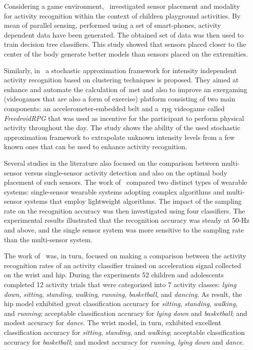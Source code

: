 Considering a game environment,~\cite{jablonsky_evaluating_2017} investigated sensor placement and modality for activity recognition within the context of children playground  activities. By mean of parallel sensing, performed using a set of smart-phones, activity dependent data have been generated. The obtained set of data was then used to train decision tree classifiers. This study showed that sensors placed closer to the center of the body generate better models than sensors placed on the extremities. 

Similarly, in~\cite{alshurafa_designing_2014} a stochastic approximation framework for intensity independent activity recognition based on clustering techniques is proposed. They aimed at enhance and automate the calculation of~\gls{met} and also to improve an exergaming (videogames that are also a form of exercise) platform consisting of two main components: an accelerometer-embedded belt and a~\gls{rpg} videogame called \textit{FreedroidRPG} that was used as incentive for the participant to perform physical activity throughout the day. The study shows the ability of the used stochastic approximation framework to extrapolate unknown intensity levels from a few known ones that can be used to enhance activity recognition.

Several studies in the literature also focused on the comparison between multi-sensor versus single-sensor activity detection and also on the optimal body placement of such sensors. The work of~\cite{gao_evaluation_2014} compared two distinct types of wearable systems: single-sensor wearable systems adopting complex algorithms and multi-sensor systems that employ lightweight algorithms. The impact of the sampling rate on the recognition accuracy was then investigated using four classifiers. The experimental results illustrated that the recognition accuracy was steady at 50-Hz and above, and the single sensor system was more sensitive to the sampling rate than the multi-sensor system.

The work of~\cite{trost_machine_2014} was, in turn, focused on making a comparison between the activity recognition rates of an activity classifier trained on acceleration signal collected on the wrist and hip. During the experiments 52 children and adolescents completed 12 activity trials that were categorized into 7 activity classes: \textit{lying down}, \textit{sitting}, \textit{standing}, \textit{walking}, \textit{running}, \textit{basketball}, and \textit{dancing}. As result, the hip model exhibited great classification accuracy for \textit{sitting}, \textit{standing}, \textit{walking}, and \textit{running}; acceptable classification accuracy for \textit{lying down} and \textit{basketball}; and modest accuracy for \textit{dance}. The wrist model, in turn, exhibited excellent classification accuracy for \textit{sitting}, \textit{standing}, and \textit{walking}; acceptable classification accuracy for \textit{basketball}; and modest accuracy for \textit{running}, \textit{lying down} and \textit{dance}.


